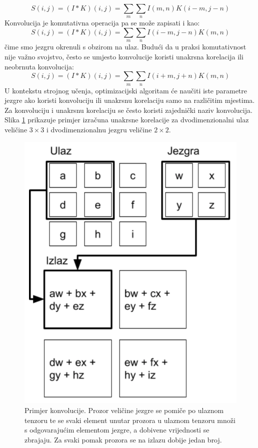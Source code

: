 \[
S(i, j) = (I \ast K)(i, j) = \sum\limits_{m} \sum\limits_{n} I(m, n)K(i - m, j - n)
\]
Konvolucija je komutativna operacija pa se može zapisati i kao:
\[
S(i, j) = (I \ast K)(i, j) = \sum\limits_{m} \sum\limits_{n} I(i - m, j - n)K(m, n)
\]
čime smo jezgru okrenuli s obzirom na ulaz. 
Budući da u praksi komutativnost nije važno svojstvo, često se umjesto konvolucije koristi unakrsna korelacija ili neobrnuta konvolucija:
\[
S(i, j) = (I \ast K)(i, j) = \sum\limits_{m} \sum\limits_{n} I(i + m, j + n)K(m, n)
\]
U kontekstu strojnog učenja, optimizacijski algoritam će naučiti iste parametre jezgre ako koristi konvoluciju ili unakrsnu korelaciju samo na različitim mjestima. Za konvoluciju i unakrsnu korelaciju se često koristi zajednički naziv konvolucija. Slika \ref{konvolucija} prikazuje primjer izračuna unakrsne korelacije za dvodimenzionalni ulaz veličine $3 \times 3$ i dvodimenzionalnu jezgru veličine $2 \times 2$.

 \begin{figure}
	\centering
	\includegraphics[scale=0.6]{img/konvolucija.png}
	\caption{Primjer konvolucije. Prozor veličine jezgre se pomiče po ulaznom tenzoru te se svaki element unutar prozora u ulaznom tenzoru množi s odgovarajućim elementom jezgre, a dobivene vrijednosti se zbrajaju. Za svaki pomak prozora se na izlazu dobije jedan broj.}
	\label{konvolucija}
\end{figure}

